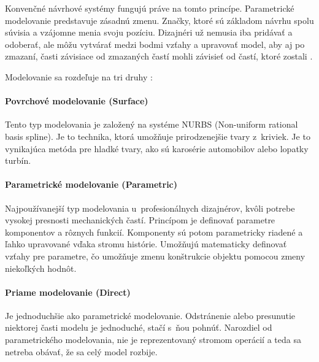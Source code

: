 Konvenčné návrhové systémy fungujú práve na tomto princípe. Parametrické modelovanie predstavuje zásadnú zmenu. Značky, ktoré sú základom návrhu spolu súvisia a vzájomne menia svoju pozíciu. Dizajnéri už nemusia iba pridávať a odoberať, ale môžu vytvárať medzi bodmi vzťahy a upravovať model, aby aj po zmazaní, časti závisiace od zmazaných častí mohli závisieť od častí, ktoré zostali \cite{woodbury2010elements}. 








Modelovanie sa rozdeľuje na tri druhy \cite{recrosio_2017}:

\paragraph{Povrchové modelovanie (Surface)}
Tento typ modelovania je založený na systéme NURBS (Non-uniform rational basis spline). Je to technika, ktorá umožňuje prirodzenejšie tvary z~kriviek. Je to vynikajúca metóda pre  hladké tvary, ako sú karosérie automobilov alebo lopatky turbín.

\paragraph{Parametrické modelovanie (Parametric)}
Najpoužívanejší typ modelovania u~profesionálnych dizajnérov, kvôli potrebe vysokej presnosti mechanických častí. Princípom je definovať parametre komponentov a rôznych funkcií. Komponenty sú potom parametricky riadené a ľahko upravované vďaka  stromu histórie. Umožňujú matematicky definovať vzťahy pre parametre, čo umožňuje zmenu konštrukcie objektu pomocou zmeny niekoľkých hodnôt.

\paragraph{Priame modelovanie (Direct)}
Je jednoduchšie ako parametrické modelovanie. Odstránenie alebo presunutie niektorej časti modelu je jednoduché, stačí s~ňou pohnúť. Narozdiel od parametrického modelovania, nie je reprezentovaný stromom operácií a teda sa netreba obávať, že sa celý model rozbije. 


